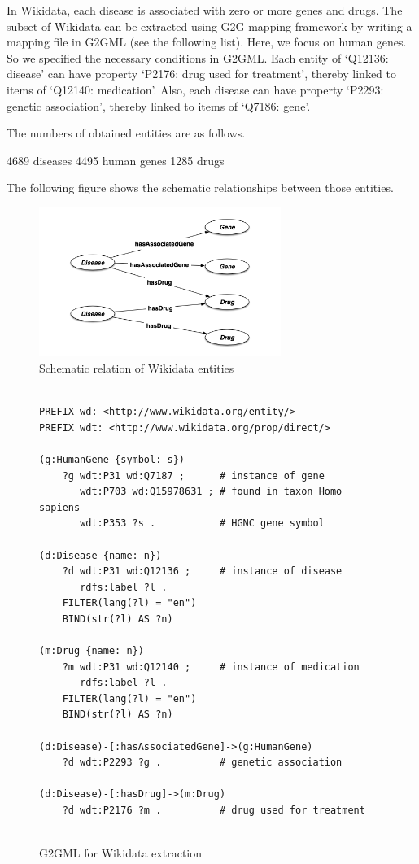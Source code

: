 \documentclass[runningheads]{llncs}
\begin{document}
In Wikidata, each disease is associated with zero or more genes and drugs.
The subset of Wikidata can be extracted using G2G mapping framework by writing a mapping file in G2GML (see the following list).
Here, we focus on human genes. So we specified the necessary conditions in G2GML.
Each entity of ‘Q12136: disease’ can have property ‘P2176: drug used for treatment’, thereby linked to items of ‘Q12140: medication’. Also, each disease can have property ‘P2293: genetic association’, thereby linked to items of ‘Q7186: gene’.
 
The numbers of obtained entities are as follows.
 
4689 diseases
4495 human genes
1285 drugs
 
The following figure shows the schematic relationships between those entities.
 
\begin{figure}
\center
\includegraphics[width=0.7\textwidth]{wikidata_schema.png}
\caption{Schematic relation of Wikidata entities}
\label{fig:wikidata_schema.png}
\end{figure}
 
\begin{figure}[!t]
\vspace{2mm}
\begin{scriptsize}
\begin{verbatim}
 
PREFIX wd: <http://www.wikidata.org/entity/>
PREFIX wdt: <http://www.wikidata.org/prop/direct/>
 
(g:HumanGene {symbol: s})
    ?g wdt:P31 wd:Q7187 ;      # instance of gene
       wdt:P703 wd:Q15978631 ; # found in taxon Homo sapiens
       wdt:P353 ?s .           # HGNC gene symbol
 
(d:Disease {name: n})
    ?d wdt:P31 wd:Q12136 ;     # instance of disease
       rdfs:label ?l .
    FILTER(lang(?l) = "en")
    BIND(str(?l) AS ?n)
 
(m:Drug {name: n})
    ?m wdt:P31 wd:Q12140 ;     # instance of medication
       rdfs:label ?l .
    FILTER(lang(?l) = "en")
    BIND(str(?l) AS ?n)
 
(d:Disease)-[:hasAssociatedGene]->(g:HumanGene)
    ?d wdt:P2293 ?g .          # genetic association
 
(d:Disease)-[:hasDrug]->(m:Drug)
    ?d wdt:P2176 ?m .          # drug used for treatment
 
\end{verbatim}
\end{scriptsize}
\caption{G2GML for Wikidata extraction}
\label{fig:g2gml_wikidata}
\end{figure}
 
\end{document}
